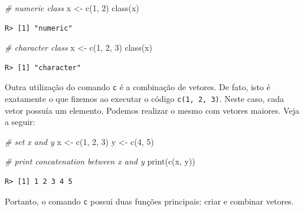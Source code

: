 \documentclass[
  11pt,
]{book}
\newenvironment{Shaded}{\begin{snugshade}}{\end{snugshade}}
\newcommand{\CommentTok}[1]{\textcolor[rgb]{0.37,0.37,0.37}{\textit{#1}}}
\newcommand{\DecValTok}[1]{\textcolor[rgb]{0.06,0.06,0.06}{#1}}
\newcommand{\FunctionTok}[1]{\textcolor[rgb]{0,0,0}{#1}}
\newcommand{\NormalTok}[1]{#1}
\newcommand{\OtherTok}[1]{\textcolor[rgb]{0.37,0.37,0.37}{#1}}
\newcommand{\StringTok}[1]{\textcolor[rgb]{0.5,0.5,0.5}{#1}}
\begin{document}
\begin{Shaded}
\begin{Highlighting}[]
\CommentTok{\# numeric class}
\NormalTok{x }\OtherTok{\textless{}{-}} \FunctionTok{c}\NormalTok{(}\DecValTok{1}\NormalTok{, }\DecValTok{2}\NormalTok{)}
\FunctionTok{class}\NormalTok{(x)}
\end{Highlighting}
\end{Shaded}

\begin{verbatim}
R> [1] "numeric"
\end{verbatim}

\begin{Shaded}
\begin{Highlighting}[]
\CommentTok{\# character class}
\NormalTok{x }\OtherTok{\textless{}{-}} \FunctionTok{c}\NormalTok{(}\DecValTok{1}\NormalTok{, }\DecValTok{2}\NormalTok{, }\StringTok{\textquotesingle{}3\textquotesingle{}}\NormalTok{)}
\FunctionTok{class}\NormalTok{(x)}
\end{Highlighting}
\end{Shaded}

\begin{verbatim}
R> [1] "character"
\end{verbatim}

Outra utilização do comando \texttt{c} é a combinação de vetores. De fato, isto é exatamente o que fizemos ao executar o código \texttt{c(1,\ 2,\ 3)}. Neste caso, cada vetor possuía um elemento. Podemos realizar o mesmo com vetores maiores. Veja a seguir:

\begin{Shaded}
\begin{Highlighting}[]
\CommentTok{\# set x and y}
\NormalTok{x }\OtherTok{\textless{}{-}} \FunctionTok{c}\NormalTok{(}\DecValTok{1}\NormalTok{, }\DecValTok{2}\NormalTok{, }\DecValTok{3}\NormalTok{)}
\NormalTok{y }\OtherTok{\textless{}{-}} \FunctionTok{c}\NormalTok{(}\DecValTok{4}\NormalTok{, }\DecValTok{5}\NormalTok{)}

\CommentTok{\# print concatenation between x and y}
\FunctionTok{print}\NormalTok{(}\FunctionTok{c}\NormalTok{(x, y))}
\end{Highlighting}
\end{Shaded}

\begin{verbatim}
R> [1] 1 2 3 4 5
\end{verbatim}

Portanto, o comando \texttt{c} possui duas funções principais: criar e combinar vetores.
\end{document}
